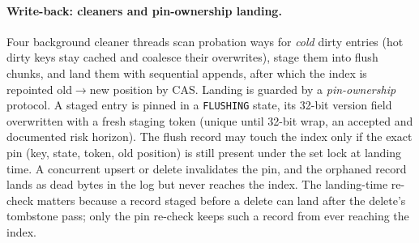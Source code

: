 \documentclass{article}
\begin{document}
\paragraph{Write-back: cleaners and pin-ownership landing.}
Four background cleaner threads scan probation ways for \emph{cold} dirty entries (hot dirty keys stay cached and coalesce their overwrites), stage them into flush chunks, and land them with sequential appends, after which the index is repointed old$\to$new position by CAS. Landing is guarded by a \emph{pin-ownership} protocol. A staged entry is pinned in a \texttt{FLUSHING} state, its 32-bit version field overwritten with a fresh staging token (unique until 32-bit wrap, an accepted and documented risk horizon). The flush record may touch the index only if the exact pin (key, state, token, old position) is still present under the set lock at landing time. A concurrent upsert or delete invalidates the pin, and the orphaned record lands as dead bytes in the log but never reaches the index. The landing-time re-check matters because a record staged before a delete can land after the delete's tombstone pass; only the pin re-check keeps such a record from ever reaching the index.
\end{document}
